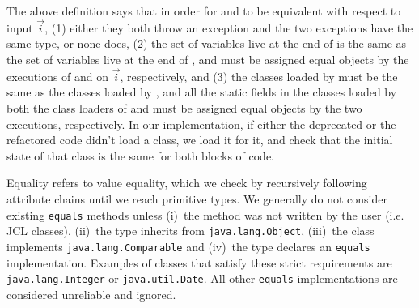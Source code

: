 \documentclass[sigconf,review,anonymous]{acmart}
\begin{document}

The above definition says that in order for  and
 to be equivalent with respect to input $\vec{i}$,
(1) either they both throw an exception and the two exceptions have the same type, or none does,
(2) the set of variables live at the end of  is the same as the set of variables live at the end of  , and must be
assigned equal objects by the executions of  and
 on $\vec{i}$, respectively, and
(3) the classes loaded by  must be the same as the classes loaded by , and
all the static fields in the classes loaded by both the class loaders of  and  must be assigned equal objects by the
two executions, respectively.  
In our implementation, if either the deprecated or the refactored code didn't load a class, we load it for it,
and check that the initial state of that class is the same for both blocks of code.

Equality refers to value equality, which we
check by recursively following attribute chains until we reach
primitive types.
We generally do not consider existing \texttt{equals} methods
unless (i)~the method was not written by the user (i.e.  JCL classes),
(ii)~the type inherits from \texttt{java.lang.Object}, (iii)~the class
implements \texttt{java.lang.Comparable} and (iv)~the type declares an
\texttt{equals} implementation.  Examples of classes that satisfy these
strict requirements are \texttt{java.lang.Integer} or
\texttt{java.util.Date}.  All other \texttt{equals} implementations are
considered unreliable and ignored.





\end{document}
